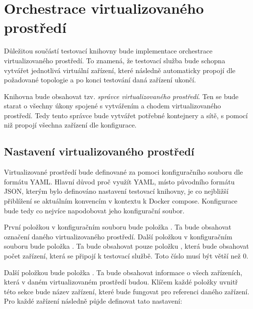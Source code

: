 \section{Orchestrace virtualizovaného prostředí}

Důležitou součástí testovací knihovny bude implementace orchestrace virtualizovaného prostředí. To znamená, že testovací služba bude schopna vytvářet jednotlivá virtuální zařízení, které následně automaticky propojí dle požadované topologie a po konci testování daná zařízení ukončí. 

Knihovna bude obsahovat tzv. \textit{správce virtualizovaného prostředí}. Ten se bude starat o všechny úkony spojené s vytvářením a chodem virtualizovaného prostředí. Tedy tento správce bude vytvářet potřebné kontejnery a sítě, s pomocí niž propojí všechna zařízení dle konfigurace. 

\subsection{Nastavení virtualizovaného prostředí}\label{sec:env_conf}

Virtualizované prostředí bude definované za pomoci konfiguračního souboru dle formátu YAML. Hlavní důvod proč využít YAML, místo původního formátu JSON, kterým bylo definováno nastavení testovací knihovny, je co nejbližší přiblížení se aktuálním konvencím v kontextu k Docker compose. Konfigurace bude tedy co nejvíce napodobovat jeho konfigurační soubor. 

První položkou v konfiguračním souboru bude položka . Ta bude obsahovat označení daného virtualizovaného prostředí. Další položkou v konfiguračním souboru bude položka . Ta bude obsahovat pouze položku , která bude obsahovat počet zařízení, která se připojí k testovací službě. Toto číslo musí být větší než 0.

Další položkou bude položka . Ta bude obsahovat informace o všech zařízeních, která v daném virtualizovaném prostředí budou. Klíčem každé položky uvnitř této sekce bude název zařízení, které bude fungovat pro referenci daného zařízení. Pro každé zařízení následně půjde definovat tato nastavení: 

